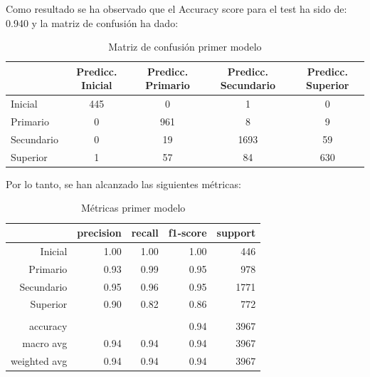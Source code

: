 \documentclass[a4paper]{article}
\begin{document}
            Como resultado se ha observado que el Accuracy score para el test ha sido de: 0.940 y la matriz de confusión ha dado:
            \begin{table}[H]
                \centering
                \begin{tabular}{lcccc}
                    \toprule
                    ~ & Predicc. Inicial & Predicc. Primario & Predicc. Secundario & Predicc. Superior \\ \midrule
                    Inicial & 445 & 0 & 1 & 0 \\       
                    Primario & 0 & 961 & 8 & 9 \\      
                    Secundario & 0 & 19 & 1693 & 59 \\ 
                    Superior & 1 & 57 & 84 & 630 \\    
                    \bottomrule
                \end{tabular}
                \caption{Matriz de confusión primer modelo}
                \label{First model confusion matrix}
            \end{table}

            Por lo tanto, se han alcanzado las siguientes métricas:

            \begin{table}[H]
                \centering
                \begin{tabular}{rrrrr}
                    \toprule
                    ~ & precision & recall & f1-score & support \\ \midrule
                    Inicial    & 1.00& 1.00 & 1.00 & 446 \\ 
                    Primario   & 0.93 & 0.99 & 0.95 & 978 \\ 
                    Secundario & 0.95 & 0.96 & 0.95 & 1771 \\ 
                    Superior   & 0.90 & 0.82 & 0.86 & 772 \\ 
                    & & & & \\
                    accuracy & & & 0.94 & 3967 \\ 
                    macro avg & 0.94 & 0.94 & 0.94 & 3967 \\ 
                    weighted avg & 0.94 & 0.94 & 0.94 & 3967 \\ 
                    \bottomrule
                \end{tabular}
                \caption{Métricas primer modelo}
                \label{First model metrics}
            \end{table}
\end{document}
